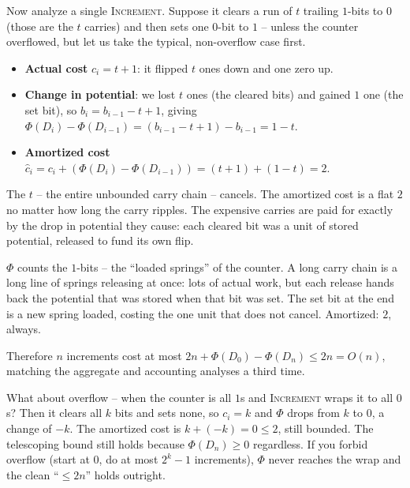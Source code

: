 Now analyze a single \textsc{Increment}. Suppose it clears a run of $t$ trailing
$1$-bits to $0$ (those are the $t$ carries) and then sets one $0$-bit to $1$ --
unless the counter overflowed, but let us take the typical, non-overflow case
first.

\begin{itemize}
  \item \textbf{Actual cost} $c_i = t + 1$: it flipped $t$ ones down and one zero
        up.
  \item \textbf{Change in potential}: we lost $t$ ones (the cleared bits) and
        gained $1$ one (the set bit), so $b_i = b_{i-1} - t + 1$, giving
        $\Phi(D_i) - \Phi(D_{i-1}) = (b_{i-1} - t + 1) - b_{i-1} = 1 - t$.
  \item \textbf{Amortized cost} $\hat{c}_i = c_i + (\Phi(D_i) - \Phi(D_{i-1}))
        = (t+1) + (1 - t) = 2$.
\end{itemize}

The $t$ -- the entire unbounded carry chain -- cancels.
The amortized cost is a flat $2$ no matter how long the carry ripples. The
expensive carries are paid for exactly by the drop in potential they cause: each
cleared bit was a unit of stored potential, released to fund its own flip.

\begin{intuitionbox}
$\Phi$ counts the $1$-bits -- the ``loaded springs'' of the counter. A long carry
chain is a long line of springs releasing at once: lots of actual work, but each
release hands back the potential that was stored when that bit was set. The set
bit at the end is a new spring loaded, costing the one unit that does not cancel.
Amortized: $2$, always.
\end{intuitionbox}

Therefore $n$ increments cost at most $2n + \Phi(D_0) - \Phi(D_n) \le 2n = O(n)$,
matching the aggregate and accounting analyses a third time.

\begin{remark}
What about overflow -- when the counter is all $1$s and \textsc{Increment} wraps it
to all $0$s? Then it clears all $k$ bits and sets none, so $c_i = k$ and
$\Phi$ drops from $k$ to $0$, a change of $-k$. The amortized cost is
$k + (-k) = 0 \le 2$, still bounded. The telescoping bound still holds because
$\Phi(D_n) \ge 0$ regardless. If you forbid overflow (start at $0$, do at most
$2^k - 1$ increments), $\Phi$ never reaches the wrap and the clean ``$\le 2n$''
holds outright.
\end{remark}

